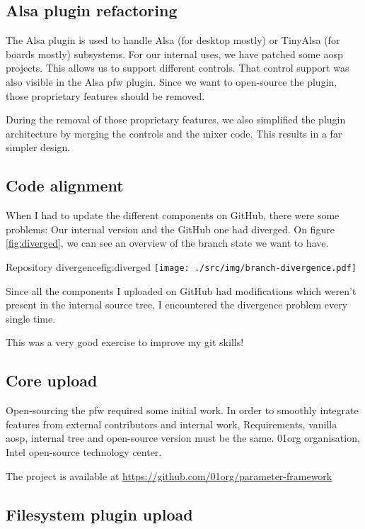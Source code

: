 \subsection{Alsa plugin refactoring}
The Alsa plugin is used to handle Alsa (for desktop mostly) or TinyAlsa (for boards mostly) subsystems.
For our internal uses, we have patched some \gls{aosp} projects.
This allows us to support different controls.
That control support was also visible in the Alsa \gls{pfw} plugin. Since
we want to open-source the plugin, those proprietary features should be removed.

During the removal of those proprietary features, we also simplified the plugin
architecture by merging the controls and the mixer code.
This results in a far simpler design.

\subsection{Code alignment}

When I had to update the different components on \gls{GitHub}, there were some problems:
Our internal version and the \gls{GitHub} one had diverged.
On figure \ref{fig:diverged}, we can see an overview of the branch state we want to have.

\begin{figureGraphics}{Repository divergence}{fig:diverged}
    \texttt{[image: ./src/img/branch-divergence.pdf]}
\end{figureGraphics}
Since all the components I uploaded on \gls{GitHub} had modifications which weren't present
in the internal source tree, I encountered the divergence problem every single time.

This was a very good exercise to improve my \gls{git} skills!

\subsection{Core upload}
Open-sourcing the \gls{pfw} required some initial work.
In order to smoothly integrate features from external contributors and internal work,
Requirements, vanilla \gls{aosp}, internal tree and open-source version must be the
same.
01org organisation, Intel open-source technology center.

The project is available at \url{https://github.com/01org/parameter-framework}

\subsection{Filesystem plugin upload}

